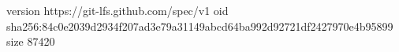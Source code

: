 version https://git-lfs.github.com/spec/v1
oid sha256:84c0e2039d2934f207ad3e79a31149abcd64ba992d92721df2427970e4b95899
size 87420
